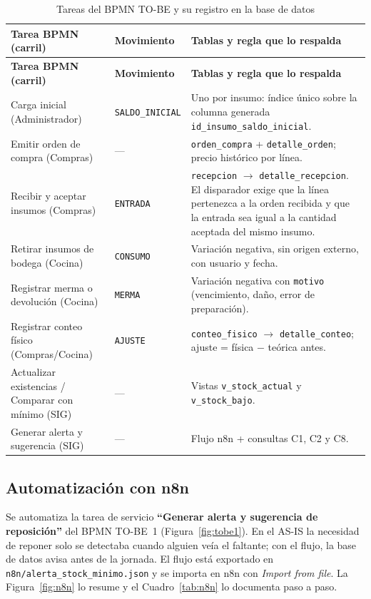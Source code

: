 \documentclass[11pt,letterpaper]{article}
\newcommand{\tablasize}{\footnotesize}
\begin{document}
{\tablasize
\begin{longtable}{>{\raggedright\arraybackslash}p{4.6cm}>{\raggedright\arraybackslash}p{2.4cm}>{\raggedright\arraybackslash}p{7.6cm}}
\caption{Tareas del BPMN TO-BE y su registro en la base de datos}\label{tab:bpmnsql}\\
\toprule \textbf{Tarea BPMN (carril)} & \textbf{Movimiento} & \textbf{Tablas y regla que lo respalda} \\ \midrule \endfirsthead
\toprule \textbf{Tarea BPMN (carril)} & \textbf{Movimiento} & \textbf{Tablas y regla que lo respalda} \\ \midrule \endhead
Carga inicial (Administrador) & \texttt{SALDO\_INICIAL} & Uno por insumo: índice único sobre la columna generada \texttt{id\_insumo\_saldo\_inicial}. \\
Emitir orden de compra (Compras) & --- & \texttt{orden\_compra} + \texttt{detalle\_orden}; precio histórico por línea. \\
Recibir y aceptar insumos (Compras) & \texttt{ENTRADA} & \texttt{recepcion} $\rightarrow$ \texttt{detalle\_recepcion}. El disparador exige que la línea pertenezca a la orden recibida y que la entrada sea igual a la cantidad aceptada del mismo insumo. \\
Retirar insumos de bodega (Cocina) & \texttt{CONSUMO} & Variación negativa, sin origen externo, con usuario y fecha. \\
Registrar merma o devolución (Cocina) & \texttt{MERMA} & Variación negativa con \texttt{motivo} (vencimiento, daño, error de preparación). \\
Registrar conteo físico (Compras/Cocina) & \texttt{AJUSTE} & \texttt{conteo\_fisico} $\rightarrow$ \texttt{detalle\_conteo}; ajuste = física $-$ teórica antes. \\
Actualizar existencias / Comparar con mínimo (SIG) & --- & Vistas \texttt{v\_stock\_actual} y \texttt{v\_stock\_bajo}. \\
Generar alerta y sugerencia (SIG) & --- & Flujo n8n + consultas C1, C2 y C8. \\
\bottomrule
\end{longtable}
}

\subsection{Automatización con n8n}
\label{sec:n8n}
Se automatiza la tarea de servicio \textbf{``Generar alerta y sugerencia de reposición''} del BPMN TO-BE~1 (Figura~\ref{fig:tobe1}). En el AS-IS la necesidad de reponer solo se detectaba cuando alguien veía el faltante; con el flujo, la base de datos avisa antes de la jornada. El flujo está exportado en \texttt{n8n/alerta\_stock\_minimo.json} y se importa en n8n con \emph{Import from file}. La Figura~\ref{fig:n8n} lo resume y el Cuadro~\ref{tab:n8n} lo documenta paso a paso.
\end{document}
